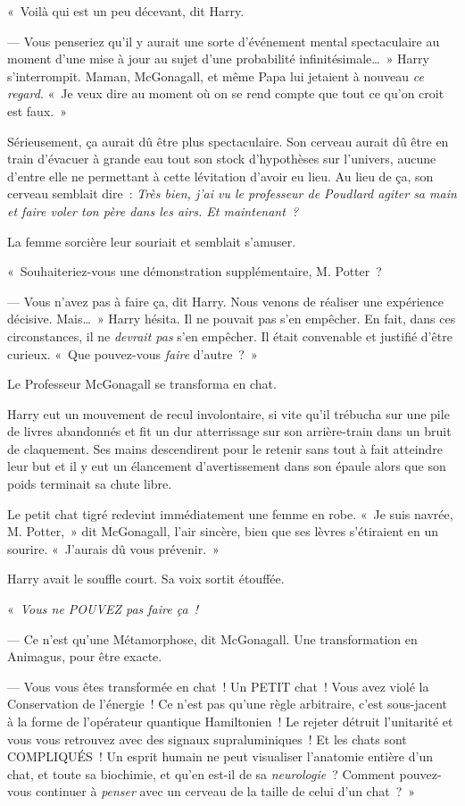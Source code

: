 «~Voilà qui est un peu décevant, dit Harry.

--- Vous penseriez qu'il y aurait une sorte d'événement mental spectaculaire au moment d'une mise à jour au sujet d'une probabilité infinitésimale…~» Harry s'interrompit. Maman, McGonagall, et même Papa lui jetaient à nouveau \emph{ce regard}. «~Je veux dire au moment où on se rend compte que tout ce qu'on croit est faux.~»

Sérieusement, ça aurait dû être plus spectaculaire. Son cerveau aurait dû être en train d'évacuer à grande eau tout son stock d'hypothèses sur l'univers, aucune d'entre elle ne permettant à cette lévitation d'avoir eu lieu. Au lieu de ça, son cerveau semblait dire~: \emph{Très bien, j'ai vu le professeur de Poudlard agiter sa main et faire voler ton père dans les airs. Et maintenant~?}

La femme sorcière leur souriait et semblait s'amuser.

«~Souhaiteriez-vous une démonstration supplémentaire, M. Potter~?

--- Vous n'avez pas à faire ça, dit Harry. Nous venons de réaliser une expérience décisive. Mais…~» Harry hésita. Il ne pouvait pas s'en empêcher. En fait, dans ces circonstances, il ne \emph{devrait pas} s'en empêcher. Il était convenable et justifié d'être curieux. «~Que pouvez-vous \emph{faire} d'autre~?~»

Le Professeur McGonagall se transforma en chat.

Harry eut un mouvement de recul involontaire, si vite qu'il trébucha sur une pile de livres abandonnés et fit un dur atterrissage sur son arrière-train dans un bruit de claquement. Ses mains descendirent pour le retenir sans tout à fait atteindre leur but et il y eut un élancement d'avertissement dans son épaule alors que son poids terminait sa chute libre.

Le petit chat tigré redevint immédiatement une femme en robe. «~Je suis navrée, M. Potter,~» dit McGonagall, l'air sincère, bien que ses lèvres s'étiraient en un sourire. «~J'aurais dû vous prévenir.~»

Harry avait le souffle court. Sa voix sortit étouffée.

«~\emph{Vous ne POUVEZ pas faire ça~!}

--- Ce n'est qu'une Métamorphose, dit McGonagall. Une transformation en Animagus, pour être exacte.

--- Vous vous êtes transformée en chat~! Un PETIT chat~! Vous avez violé la Conservation de l'énergie~! Ce n'est pas qu'une règle arbitraire, c'est sous-jacent à la forme de l'opérateur quantique Hamiltonien~! Le rejeter détruit l'unitarité et vous vous retrouvez avec des signaux supraluminiques~! Et les chats sont COMPLIQUÉS~! Un esprit humain ne peut visualiser l'anatomie entière d'un chat, et toute sa biochimie, et qu'en est-il de sa \emph{neurologie}~? Comment pouvez-vous continuer à \emph{penser} avec un cerveau de la taille de celui d'un chat~?~»


